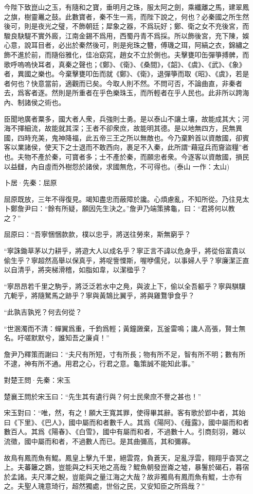 \documentclass[12pt,a4paper]{ctexbook}
\begin{document}
今陛下致崑山之玉，有隨和之寶，垂明月之珠，服太阿之劍，乘纖離之馬，建翠鳳之旗，樹靈鼉之鼓。此數寶者，秦不生一焉，而陛下說之，何也？必秦國之所生然後可，則是夜光之璧，不飾朝廷；犀象之器，不爲玩好；鄭、衛之女不充後宮，而駿良駃騠不實外廄，江南金錫不爲用，西蜀丹青不爲採。所以飾後宮，充下陳，娛心意，說耳目者，必出於秦然後可，則是宛珠之簪，傅璣之珥，阿縞之衣，錦繡之飾不進於前，而隨俗雅化，佳冶窈窕，趙女不立於側也。夫擊甕叩缶彈箏搏髀，而歌呼嗚嗚快耳者，真秦之聲也；《鄭》、《衛》、《桑間》，《韶》、《虞》、《武》、《象》者，異國之樂也。今棄擊甕叩缶而就《鄭》、《衛》，退彈箏而取《昭》、《虞》，若是者何也？快意當前，適觀而已矣。今取人則不然。不問可否，不論曲直，非秦者去，爲客者逐。然則是所重者在乎色樂珠玉，而所輕者在乎人民也。此非所以跨海內、制諸侯之術也。\par
臣聞地廣者粟多，國大者人衆，兵強則士勇。是以泰山不讓土壤，故能成其大；河海不擇細流，故能就其深；王者不卻衆庶，故能明其德。是以地無四方，民無異國，四時充美，鬼神降福，此五帝三王之所以無敵也。今乃棄黔首以資敵國，卻賓客以業諸侯，使天下之士退而不敢西向，裹足不入秦，此所謂“藉寇兵而齎盜糧”者也。夫物不產於秦，可寶者多；士不產於秦，而願忠者衆。今逐客以資敵國，損民以益讎，內自虛而外樹怨於諸侯，求國無危，不可得也。(泰山 一作：太山)\par
卜居·先秦：屈原 \par
屈原既放，三年不得復見。竭知盡忠而蔽障於讒。心煩慮亂，不知所從。乃往見太卜鄭詹尹曰：“餘有所疑，願因先生決之。”詹尹乃端策拂龜，曰：“君將何以教之？”\par
屈原曰：“吾寧悃悃款款，樸以忠乎，將送往勞來，斯無窮乎？\par
“寧誅鋤草茅以力耕乎，將遊大人以成名乎？寧正言不諱以危身乎，將從俗富貴以偷生乎？寧超然高舉以保真乎，將哫訾慄斯，喔咿儒兒，以事婦人乎？寧廉潔正直以自清乎，將突梯滑稽，如脂如韋，以潔楹乎？\par
“寧昂昂若千里之駒乎，將泛泛若水中之鳧，與波上下，偷以全吾軀乎？寧與騏驥亢軛乎，將隨駑馬之跡乎？寧與黃鵠比翼乎，將與雞鶩爭食乎？\par
“此孰吉孰兇？何去何從？\par
“世溷濁而不清：蟬翼爲重，千鈞爲輕；黃鐘譭棄，瓦釜雷鳴；讒人高張，賢士無名。吁嗟默默兮，誰知吾之廉貞！”\par
詹尹乃釋策而謝曰：“夫尺有所短，寸有所長；物有所不足，智有所不明；數有所不逮，神有所不通。用君之心，行君之意。龜策誠不能知此事。”\par
對楚王問·先秦：宋玉 \par
楚襄王問於宋玉曰：“先生其有遺行與？何士民衆庶不譽之甚也！”\par
宋玉對曰：“唯，然，有之！願大王寬其罪，使得畢其辭。客有歌於郢中者，其始曰《下里》、《巴人》，國中屬而和者數千人。其爲《陽阿》、《薤露》，國中屬而和者數百人。其爲《陽春》、《白雪》，國中有屬而和者，不過數十人。引商刻羽，雜以流徵，國中屬而和者，不過數人而已。是其曲彌高，其和彌寡。\par
故鳥有鳳而魚有鯤。鳳皇上擊九千里，絕雲霓，負蒼天，足亂浮雲，翱翔乎杳冥之上。夫蕃籬之鷃，豈能與之料天地之高哉？鯤魚朝發崑崙之墟，暴鬐於碣石，暮宿於孟諸。夫尺澤之鯢，豈能與之量江海之大哉？故非獨鳥有鳳而魚有鯤，士亦有之。夫聖人瑰意琦行，超然獨處，世俗之民，又安知臣之所爲哉？”\par
\end{document}
